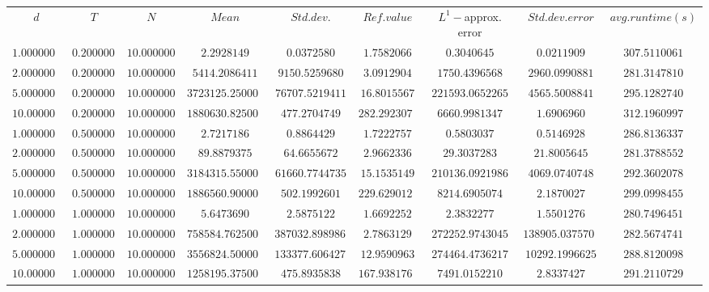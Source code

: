 \begin{tabular}{ccccccccc}
$d$ & $T$ & $N$ & $Mean$ & $Std. dev.$ & $Ref. value$ & $L^1-$approx. error & $Std. dev. error$ & $avg. runtime (s)$\\
$1.0000000$ & $0.2000000$ & $10.0000000$ & $2.2928149$ & $0.0372580$ & $1.7582066$ & $0.3040645$ & $0.0211909$ & $307.5110061$\\
$2.0000000$ & $0.2000000$ & $10.0000000$ & $5414.2086411$ & $9150.5259680$ & $3.0912904$ & $1750.4396568$ & $2960.0990881$ & $281.3147810$\\
$5.0000000$ & $0.2000000$ & $10.0000000$ & $3723125.2500000$ & $76707.5219411$ & $16.8015567$ & $221593.0652265$ & $4565.5008841$ & $295.1282740$\\
$10.0000000$ & $0.2000000$ & $10.0000000$ & $1880630.8250000$ & $477.2704749$ & $282.2923073$ & $6660.9981347$ & $1.6906960$ & $312.1960997$\\
$1.0000000$ & $0.5000000$ & $10.0000000$ & $2.7217186$ & $0.8864429$ & $1.7222757$ & $0.5803037$ & $0.5146928$ & $286.8136337$\\
$2.0000000$ & $0.5000000$ & $10.0000000$ & $89.8879375$ & $64.6655672$ & $2.9662336$ & $29.3037283$ & $21.8005645$ & $281.3788552$\\
$5.0000000$ & $0.5000000$ & $10.0000000$ & $3184315.5500000$ & $61660.7744735$ & $15.1535149$ & $210136.0921986$ & $4069.0740748$ & $292.3602078$\\
$10.0000000$ & $0.5000000$ & $10.0000000$ & $1886560.9000000$ & $502.1992601$ & $229.6290127$ & $8214.6905074$ & $2.1870027$ & $299.0998455$\\
$1.0000000$ & $1.0000000$ & $10.0000000$ & $5.6473690$ & $2.5875122$ & $1.6692252$ & $2.3832277$ & $1.5501276$ & $280.7496451$\\
$2.0000000$ & $1.0000000$ & $10.0000000$ & $758584.7625000$ & $387032.8989866$ & $2.7863129$ & $272252.9743045$ & $138905.0375708$ & $282.5674741$\\
$5.0000000$ & $1.0000000$ & $10.0000000$ & $3556824.5000000$ & $133377.6064270$ & $12.9590963$ & $274464.4736217$ & $10292.1996625$ & $288.8120098$\\
$10.0000000$ & $1.0000000$ & $10.0000000$ & $1258195.3750000$ & $475.8935838$ & $167.9381766$ & $7491.0152210$ & $2.8337427$ & $291.2110729$\\
\end{tabular}
